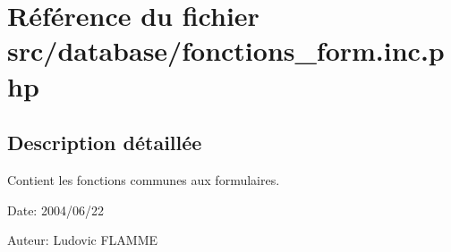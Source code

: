 \section{Référence du fichier src/database/fonctions\_\-form.inc.php}
\label{fonctions__form_8inc_8php}


\subsection{Description détaillée}
Contient les fonctions communes aux formulaires. 

\begin{Desc}
\item[Date:]2004/06/22\end{Desc}
\begin{Desc}
\item[Auteur:]Ludovic FLAMME \end{Desc}



